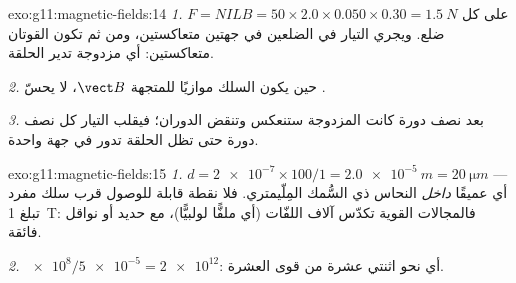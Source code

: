 \begin{solution}{exo:g11:magnetic-fields:14}
\emph{1.} $F = NILB = 50 \times 2.0 \times 0.050 \times 0.30 =
\qty{1.5}{N}$ على كل ضلع. ويجري التيار في الضلعين في جهتين
متعاكستين، ومن ثم تكون القوتان متعاكستين: أي مزدوجة تدير الحلقة.

\emph{2.} حين يكون السلك موازيًا للمتجهة $\vect B$، لا يحسّ .

\emph{3.} بعد نصف دورة كانت المزدوجة ستنعكس وتنقض
الدوران؛ فيقلب  التيار كل نصف دورة حتى تظل الحلقة
تدور في جهة واحدة.
\end{solution}

\begin{solution}{exo:g11:magnetic-fields:15}
\emph{1.} $d = \num{2e-7} \times 100 / 1 = \qty{2.0e-5}{m} =
\qty{20}{\micro m}$ --- أي عميقًا \emph{داخل} النحاس ذي السُّمك المِلّيمتري.
فلا نقطة قابلة للوصول قرب سلك مفرد تبلغ \qty{1}{T}: فالمجالات
القوية تكدّس آلاف اللفّات (أي ملفًّا لولبيًّا)، مع حديد أو
نواقل فائقة.

\emph{2.} $\num{e8} / \num{5e-5} = \num{2e12}$: أي نحو اثنتي عشرة  من قوى
العشرة.
\end{solution}

